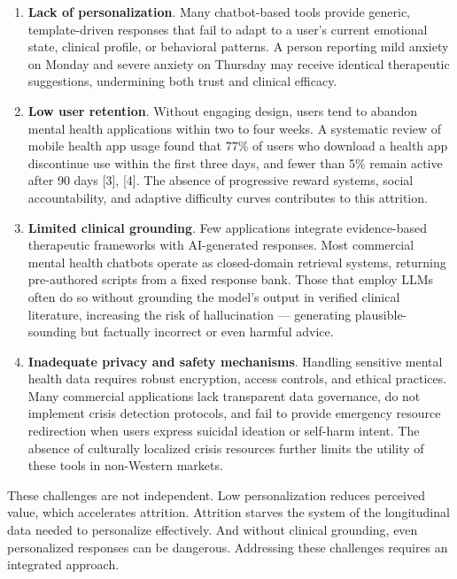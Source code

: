 \documentclass[
  letterpaper,
  12pt,
  a4paper,
  openany]{report}
\begin{document}
\begin{enumerate}
\def\labelenumi{\arabic{enumi}.}
\item
  \textbf{Lack of personalization}. Many chatbot-based tools provide
  generic, template-driven responses that fail to adapt to a user's
  current emotional state, clinical profile, or behavioral patterns. A
  person reporting mild anxiety on Monday and severe anxiety on Thursday
  may receive identical therapeutic suggestions, undermining both trust
  and clinical efficacy.
\item
  \textbf{Low user retention}. Without engaging design, users tend to
  abandon mental health applications within two to four weeks. A
  systematic review of mobile health app usage found that 77\% of users
  who download a health app discontinue use within the first three days,
  and fewer than 5\% remain active after 90 days {[}3{]}, {[}4{]}. The
  absence of progressive reward systems, social accountability, and
  adaptive difficulty curves contributes to this attrition.
\item
  \textbf{Limited clinical grounding}. Few applications integrate
  evidence-based therapeutic frameworks with AI-generated responses.
  Most commercial mental health chatbots operate as closed-domain
  retrieval systems, returning pre-authored scripts from a fixed
  response bank. Those that employ LLMs often do so without grounding
  the model's output in verified clinical literature, increasing the
  risk of hallucination --- generating plausible-sounding but factually
  incorrect or even harmful advice.
\item
  \textbf{Inadequate privacy and safety mechanisms}. Handling sensitive
  mental health data requires robust encryption, access controls, and
  ethical practices. Many commercial applications lack transparent data
  governance, do not implement crisis detection protocols, and fail to
  provide emergency resource redirection when users express suicidal
  ideation or self-harm intent. The absence of culturally localized
  crisis resources further limits the utility of these tools in
  non-Western markets.
\end{enumerate}

These challenges are not independent. Low personalization reduces
perceived value, which accelerates attrition. Attrition starves the
system of the longitudinal data needed to personalize effectively. And
without clinical grounding, even personalized responses can be
dangerous. Addressing these challenges requires an integrated approach.
\end{document}
